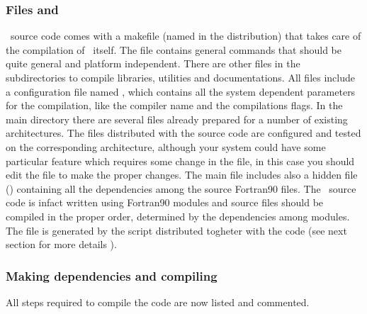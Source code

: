 \subsubsection{Files  and }

\PDAC\ source code comes with a makefile (named  in the distribution)
that takes care of the compilation of \PDAC\ itself.
The  file contains general commands that should be quite general
and platform independent. There are other  files in the 
subdirectories to compile libraries, utilities and documentations.
All  files include a configuration file named ,
which contains all the system dependent parameters for the compilation,
like the compiler name and the compilations flags.
In the main directory there are several  files already prepared
for a number of existing architectures. 
The  files distributed with the source code
are configured and tested on the corresponding architecture, although your system
could have some particular feature which requires some change in the 
 file, in this case you should edit the file to make the
proper changes. 
The main  file includes also a hidden file () 
containing all the dependencies among the source Fortran90 files. The \PDAC\ 
source code is infact written using Fortran90 modules and source files
should be compiled in the proper order, determined by the dependencies
among modules. The file \FIL{.dependencies} is generated by the  script
distributed togheter with the code (see next section for more details ).

\subsubsection{Making dependencies and compiling}

All steps required to compile the code are now listed and commented.

